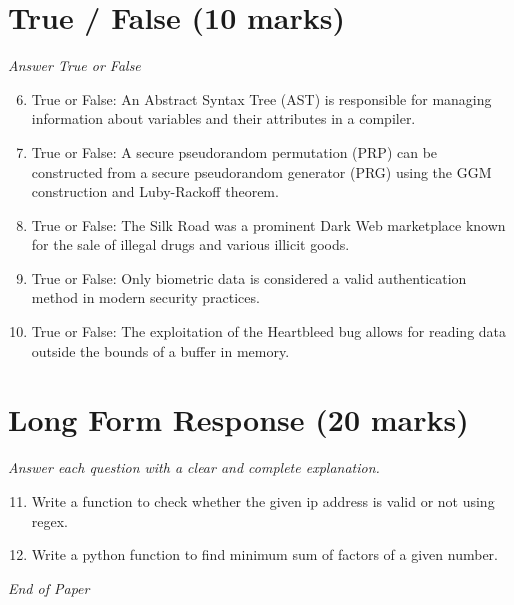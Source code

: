 \documentclass[12pt]{article}
\begin{document}
\section*{True / False (10 marks)}
\textit{Answer True or False}
\begin{enumerate}[label=\arabic*.]
\setcounter{enumi}{5}
\item True or False: An Abstract Syntax Tree (AST) is responsible for managing information about variables and their attributes in a compiler.
\item True or False: A secure pseudorandom permutation (PRP) can be constructed from a secure pseudorandom generator (PRG) using the GGM construction and Luby-Rackoff theorem.
\item True or False: The Silk Road was a prominent Dark Web marketplace known for the sale of illegal drugs and various illicit goods.
\item True or False: Only biometric data is considered a valid authentication method in modern security practices.
\item True or False: The exploitation of the Heartbleed bug allows for reading data outside the bounds of a buffer in memory.
\end{enumerate}

\section*{Long Form Response (20 marks)}
\textit{Answer each question with a clear and complete explanation.}
\begin{enumerate}[label=\arabic*.]
\setcounter{enumi}{10}
\item Write a function to check whether the given ip address is valid or not using regex.
\item Write a python function to find minimum sum of factors of a given number.
\end{enumerate}

\vfill
\noindent\textit{End of Paper}
\end{document}
